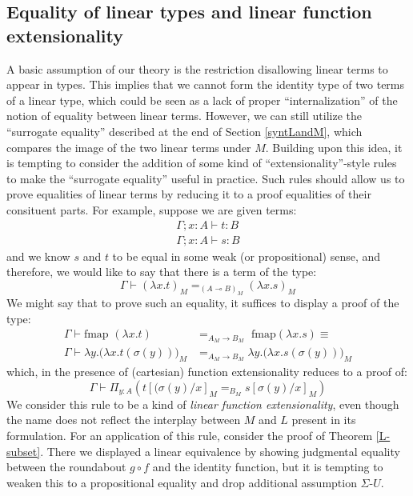 \documentclass[a4paper,english]{lipics-v2018}
\begin{document}
  \subsection{Equality of linear types and linear function extensionality}\label{extensionality}
  A basic assumption of our theory is the restriction disallowing linear terms to appear in types. This implies that we cannot form the identity type of two terms of a linear type, which could be seen as a lack of proper ``internalization'' of the notion of equality between linear terms. However, we can still utilize the ``surrogate equality'' described at the end of Section \ref{syntLandM}, which compares the image of the two linear terms under $M$. Building upon this idea, it is tempting to consider the addition of some kind of ``extensionality''-style rules to make the ``surrogate equality'' useful in practice. Such rules should allow us to prove equalities of linear terms by reducing it to a proof equalities of their consituent parts. For example, suppose we are given terms:
  \[
    \begin{split}
    \Gamma; x : A \vdash t : B\\
    \Gamma; x : A \vdash s : B
    \end{split}
  \]
  and we know $s$ and $t$ to be equal in some weak (or propositional) sense, and therefore, we would like to say that there is a term of the type:
  \[
    \Gamma \vdash (\lambda x. t)_M =_{(A \multimap B)_M} (\lambda x. s)_M
  \]  
  We might say that to prove such an equality, it suffices to display a proof of the type:
  \[
    \begin{split}
      \Gamma \vdash \text{fmap }(\lambda x . t) &=_{A_M \to B_M} \text{ fmap}(\lambda x. s) \equiv \\
      \Gamma \vdash \lambda y. \big (\lambda x. t(\sigma(y)) \big )_M &=_{A_M \to B_M} \lambda y. \big (\lambda x. s(\sigma(y)) \big )_M
    \end{split}
  \]
  which, in the presence of (cartesian) function extensionality reduces to a proof of:
  \[
    \Gamma \vdash \Pi_{y : A} \left ( t[(\sigma(y)/x]_M =_{B_M} s[\sigma(y)/x]_M  \right )
  \]
  We consider this rule to be a kind of \textit{linear function extensionality}, even though the name does not reflect the interplay between $M$ and $L$ present in its formulation. For an application of this rule, consider the proof of Theorem \ref{L-subset}. There we displayed a linear equivalence by showing judgmental equality between the roundabout $g \circ f$ and the identity function, but it is tempting to weaken this to a propositional equality and drop additional assumption $\Sigma$-$U$.
\end{document}
